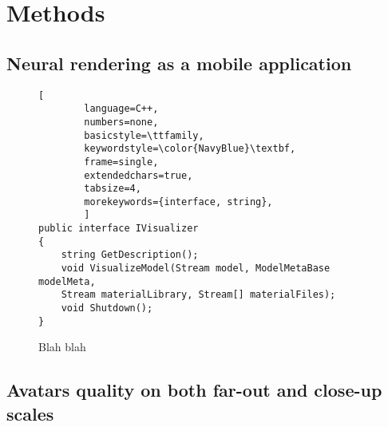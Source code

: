 \chapter{Methods}\label{chapter:methods}

\section{Neural rendering as a mobile application}
\label{methods:app}

\begin{figure}[!htbp]
	\centering
	\begin{lstlisting}[
		language=C++,
		numbers=none,
		basicstyle=\ttfamily,
		keywordstyle=\color{NavyBlue}\textbf,
		frame=single,
		extendedchars=true,
		tabsize=4,
		morekeywords={interface, string},
		]
public interface IVisualizer
{
	string GetDescription();
	void VisualizeModel(Stream model, ModelMetaBase modelMeta, 
	Stream materialLibrary, Stream[] materialFiles);
	void Shutdown();
} 
	\end{lstlisting}
	\caption{Blah blah}\label{res:code:example}
\end{figure}

\section{Avatars quality on both far-out and close-up scales}
\label{methods:zooms}